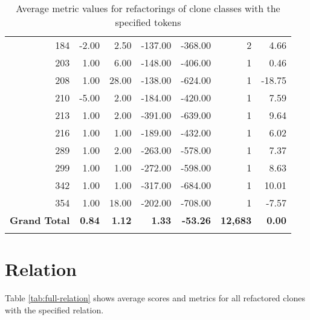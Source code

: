 \begin{appendices}
\begin{longtable}[c]{@{}rrrrrrr@{}}
184 & -2.00 & 2.50 & -137.00 & -368.00 & 2 & 4.66 \\

203 & 1.00 & 6.00 & -148.00 & -406.00 & 1 & 0.46 \\

208 & 1.00 & 28.00 & -138.00 & -624.00 & 1 & -18.75 \\

210 & -5.00 & 2.00 & -184.00 & -420.00 & 1 & 7.59 \\

213 & 1.00 & 2.00 & -391.00 & -639.00 & 1 & 9.64 \\

216 & 1.00 & 1.00 & -189.00 & -432.00 & 1 & 6.02 \\

289 & 1.00 & 2.00 & -263.00 & -578.00 & 1 & 7.37 \\

299 & 1.00 & 1.00 & -272.00 & -598.00 & 1 & 8.63 \\

342 & 1.00 & 1.00 & -317.00 & -684.00 & 1 & 10.01 \\

354 & 1.00 & 18.00 & -202.00 & -708.00 & 1 & -7.57 \\* \midrule
\textbf{Grand Total} & \textbf{0.84} & \textbf{1.12} & \textbf{1.33} & \textbf{-53.26} & \textbf{12,683} & \textbf{0.00} \\* \bottomrule
\caption{Average metric values for refactorings of clone classes with the specified tokens}
\label{tab:full-tokens}\\
\end{longtable}
\newpage

\section{Relation}
Table \ref{tab:full-relation} shows average scores and metrics for all refactored clones with the specified relation.


\end{appendices}
